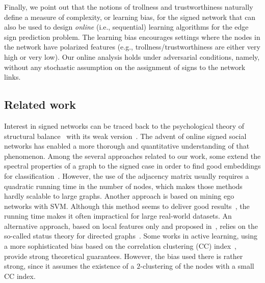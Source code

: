 Finally, we point out that the notions of trollness and trustworthiness naturally define a measure
of complexity, or learning bias, for the signed network that can also be used to design
\emph{online} (i.e., sequential) learning algorithms for the edge sign prediction problem. The
learning bias encourages settings where the nodes in the network have polarized features (e.g.,
trollness/trustworthiness are either very high or very low). Our online analysis holds under
adversarial conditions, namely, without any stochastic assumption on the assignment of signs to the
network links.



\subsection{Related work}

Interest in signed networks can be traced back to the psychological theory of structural
balance~\autocites{Cartwright56}{HeiderBook58} with its weak
version~\autocite{davis1967clustering}.  The advent of online signed social networks has enabled a
more thorough and quantitative understanding of that phenomenon. Among the several approaches
related to our work, some extend the spectral properties of a graph to the signed case in order to
find good embeddings for classification~\autocites{Kunegis2009}{SignedEmbedding15}. However, the
use of the adjacency matrix usually requires a quadratic running time in the number of nodes, which
makes those methods hardly scalable to large graphs. Another approach is based on mining ego
networks with SVM. Although this method seems to deliver good results~\autocite{Papaoikonomou2014},
the running time makes it often impractical for large real-world datasets. An alternative approach,
based on local features only and proposed in~\autocite{Leskovec2010}, relies on the so-called
status theory for directed graphs~\autocite{guha2004propagation}. Some works in active learning,
using a more sophisticated bias based on the correlation clustering (CC)
index~\autocites{Cesa-Bianchi2012a}{Cesa-Bianchi2012b}, provide strong theoretical guarantees.
However, the bias used there is rather strong, since it assumes the existence of a $2$-clustering
of the nodes with a small CC index.

